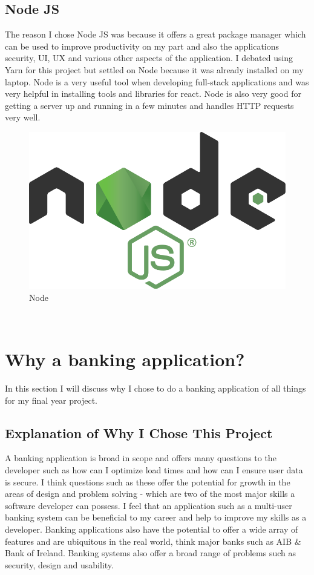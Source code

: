 \subsection{Node JS}
The reason I chose Node JS was because it offers a great package manager which can be
used to improve productivity on my part and also the applications security, UI,
UX and various other aspects of the application.  I debated using Yarn for this
project but settled on Node because it was already installed on my laptop.  Node
is a very useful tool when developing full-stack applications and was very helpful
in installing tools and libraries for react.  Node is also very good for getting a server
up and running in a few minutes and handles HTTP requests very well.
\\
\begin{figure}[H]
  \includegraphics[width=\textwidth]{img/node.png}
  \caption{Node}
  \label{fig: Image of Node Logo}
\end{figure} \cite{NodeImage}
\\
\section{Why a banking application?}
In this section I will discuss why I chose to do a banking application of all things for my final year project.
\subsection{Explanation of Why I Chose This Project}
A banking application is broad in scope and offers many questions to the developer
such as how can I optimize load times and how can I ensure user data is secure.
I think questions such as these offer the potential for growth in the areas of
design and problem solving - which are two of the most major skills a software
developer can possess. I feel that an application such as a multi-user banking
system can be beneficial to my career and help to improve my skills as a developer.
Banking applications also have the potential to offer a wide array of features and
are ubiquitous in the real world, think major banks such as AIB \& Bank of Ireland.
Banking systems also offer a broad range of problems such as security, design
and usability.
\\

